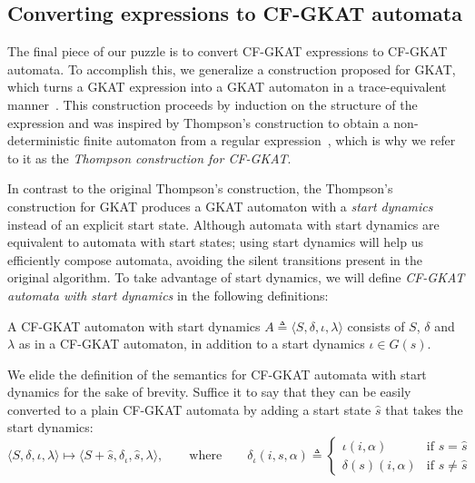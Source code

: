 \subsection{Converting expressions to CF-GKAT automata}

The final piece of our puzzle is to convert CF-GKAT expressions to CF-GKAT automata.
To accomplish this, we generalize a construction proposed for GKAT, which turns a GKAT expression into a GKAT automaton in a trace-equivalent manner~\cite{Schmid_Kappé_Kozen_Silva_2021}.
This construction proceeds by induction on the structure of the expression and was inspired by Thompson's construction to obtain a non-deterministic finite automaton from a regular expression~\cite{thompson_ProgrammingTechniquesRegular_1968}, which is why we refer to it as the \emph{Thompson construction for CF-GKAT}.

In contrast to the original Thompson's construction, the Thompson's construction for GKAT produces a GKAT automaton with a \emph{start dynamics} instead of an explicit start state. 
Although automata with start dynamics are equivalent to automata with start states; using start dynamics will help us efficiently compose automata, avoiding the silent transitions present in the original algorithm.
To take advantage of start dynamics, we will define \emph{CF-GKAT automata with start dynamics} in the following definitions:

\begin{definition}
 A CF-GKAT automaton with start dynamics \(A ≜ ⟨S, δ, ι, λ⟩\) consists of $S$, $δ$ and $λ$ as in a CF-GKAT automaton, in addition to a start dynamics \(ι ∈ G(s)\).
\end{definition}

We elide the definition of the semantics for CF-GKAT automata with start dynamics for the sake of brevity.
Suffice it to say that they can be easily converted to a plain CF-GKAT automata by adding a start state \(\hat{s}\) that takes the start dynamics:
\begin{equation}\label{cons: CF-GKAT pseudo start to CF-GKAT automata}
 ⟨S, δ, ι, λ⟩ ↦ ⟨S + \hat{s}, δ_ι, \hat{s}, λ⟩,
 \qquad
 \text{where}
 \qquad
 δ_ι(i, s, α) ≜
 \begin{cases}
  ι(i, α)    & \text{if } s = \hat{s} \\
  δ(s)(i, α) & \text{if } s ≠ \hat{s}
 \end{cases}
\end{equation}


